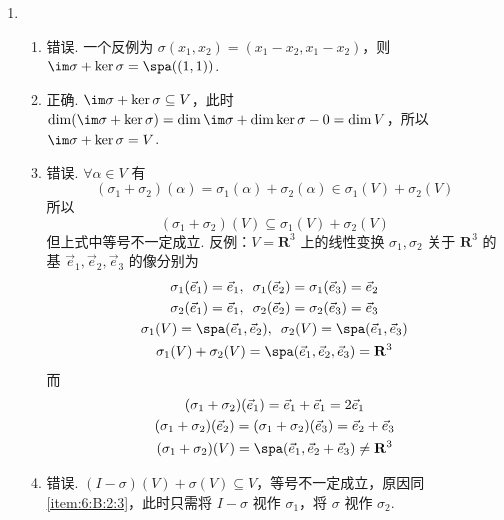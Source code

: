 \begin{enumerate}
    \item \begin{enumerate}
              \item 错误. 一个反例为 $ \sigma(x_1, x_2) = (x_1 - x_2, x_1 - x_2) $，则 $ \im \sigma + \ker \sigma = \spa((1, 1)) $.

              \item 正确. $ \im \sigma + \ker \sigma \subseteq V $，此时 $ \dim(\im \sigma + \ker \sigma) = \dim \im \sigma + \dim \ker \sigma - 0 = \dim V $，所以 $ \im \sigma + \ker \sigma = V $.

              \item \label{item:6:B:2:3}
                    错误. $ \forall \alpha \in V $ 有
                    \[ (\sigma_1 + \sigma_2)(\alpha) = \sigma_1(\alpha) + \sigma_2(\alpha) \in \sigma_1(V) + \sigma_2(V) \]
                    所以
                    \[ (\sigma_1 + \sigma_2)(V) \subseteq \sigma_1(V) + \sigma_2(V) \]
                    但上式中等号不一定成立. 反例：$ V = \mathbf{R}^3 $ 上的线性变换 $ \sigma_1, \sigma_2 $ 关于 $ \mathbf{R}^3 $ 的基 $ \vec{e}_1, \vec{e}_2, \vec{e}_3 $ 的像分别为
                    \begin{gather*}
                        \sigma_1(\vec{e}_1) = \vec{e}_1,\enspace \sigma_1(\vec{e}_2) = \sigma_1(\vec{e}_3) = \vec{e}_2 \\
                        \sigma_2(\vec{e}_1) = \vec{e}_1,\enspace \sigma_2(\vec{e}_2) = \sigma_2(\vec{e}_3) = \vec{e}_3 \\
                        \sigma_1(V) = \spa(\vec{e}_1, \vec{e}_2),\enspace \sigma_2(V) = \spa(\vec{e}_1, \vec{e}_3) \\
                        \sigma_1(V) + \sigma_2(V) = \spa(\vec{e}_1, \vec{e}_2, \vec{e}_3) = \mathbf{R}^3
                    \end{gather*}
                    而
                    \begin{gather*}
                        (\sigma_1 + \sigma_2)(\vec{e}_1) = \vec{e}_1 + \vec{e}_1 = 2 \vec{e}_1 \\
                        (\sigma_1 + \sigma_2)(\vec{e}_2) = (\sigma_1 + \sigma_2)(\vec{e}_3) = \vec{e}_2 + \vec{e}_3 \\
                        (\sigma_1 + \sigma_2)(V) = \spa(\vec{e}_1, \vec{e}_2 + \vec{e}_3) \neq \mathbf{R}^3
                    \end{gather*}

              \item 错误. $ (I - \sigma)(V) + \sigma(V) \subseteq V $，等号不一定成立，原因同 \ref*{item:6:B:2:3}，此时只需将 $ I - \sigma $ 视作 $ \sigma_1 $，将 $ \sigma $ 视作 $ \sigma_2 $.
          \end{enumerate}


\end{enumerate}
